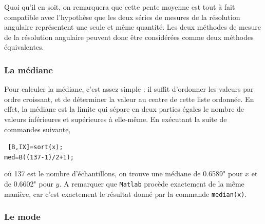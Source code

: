 Quoi qu'il en soit, on remarquera que cette pente moyenne est tout à fait compatible avec l'hypothèse que les deux séries de mesures de la résolution angulaire représentent une seule et même quantité. Les deux méthodes de mesure de la résolution angulaire peuvent donc être considérées comme deux méthodes équivalentes.

\subsubsection*{La médiane}

Pour calculer la médiane, c'est assez simple : il suffit d'ordonner les valeurs par ordre croissant, et de déterminer la valeur au centre de cette liste ordonnée. En effet, la médiane est la limite qui sépare en deux parties égales le nombre de valeurs inférieures et supérieures à elle-même. En exécutant la suite de commandes suivante,
\begin{flushleft}
\tt
[B,IX]=sort(x);\\
med=B((137-1)/2+1);\\
\end{flushleft}
\rm
où 137 est le nombre d'échantillons, on trouve une médiane de 0.6589" pour $x$ et de 0.6602" pour $y$. A remarquer que \texttt{Matlab} procède exactement de la même manière, car c'est exactement le résultat donné par la commande \texttt{median(x)}.

\subsubsection*{Le mode}

